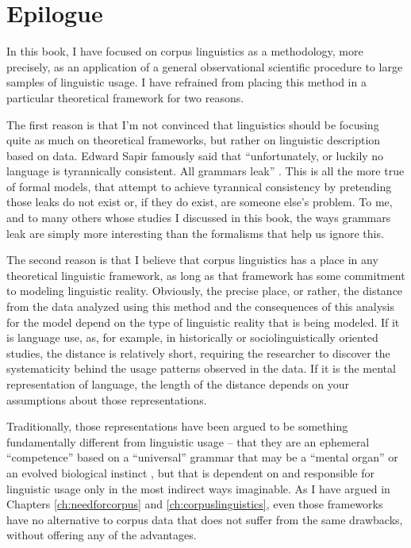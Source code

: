 \chapter{Epilogue}

In this book, I have focused on corpus linguistics as a methodology, more precisely, as an application of a general observational scientific procedure to large samples of linguistic usage. I have refrained from placing this method in a particular theoretical framework for two reasons.

The first reason is that I'm not convinced that linguistics should be focusing quite as much on theoretical frameworks, but rather on linguistic description based on data. Edward Sapir famously said that ``unfortunately, or luckily no language is tyrannically consistent. All grammars leak'' \citep[39]{sapir_language:_1921}. This is all the more true of formal models, that attempt to achieve tyrannical consistency by pretending those leaks do not exist or, if they do exist, are someone else's problem. To me, and to many others whose studies I discussed in this book, the ways grammars leak are simply more interesting than the formalisms that help us ignore this.

The second reason is that I believe that corpus linguistics has a place in any theoretical linguistic framework, as long as that framework has some commitment to modeling linguistic reality. Obviously, the precise place, or rather, the distance from the data analyzed using this method and the consequences of this analysis for the model depend on the type of linguistic reality that is being modeled. If it is language use, as, for example, in historically or sociolinguistically oriented studies, the distance is relatively short, requiring the researcher to discover the systematicity behind the usage patterns observed in the data. If it is the mental representation of language, the length of the distance depends on your assumptions about those representations.

Traditionally, those representations have been argued to be something fundamentally different from linguistic usage -- that they are an ephemeral ``competence'' based on a ``universal'' grammar that may be a ``mental organ'' \citep{chomsky_rules_1980} or an evolved biological instinct \citep{pinker_language_1994}, but that is dependent on and responsible for linguistic usage only in the most indirect ways imaginable. As I have argued in Chapters \ref{ch:needforcorpus} and \ref{ch:corpuslinguistics}, even those frameworks have no alternative to corpus data that does not suffer from the same drawbacks, without offering any of the advantages.

